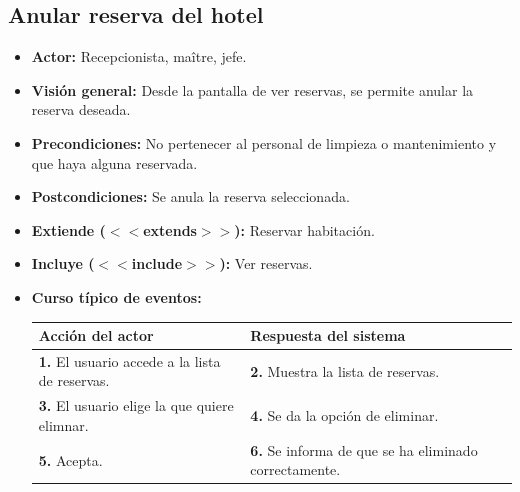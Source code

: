 \documentclass[spanish,a4paper,11pt, twoside]{report}	%
\begin{document}
	\subsection{Anular reserva del hotel}
		\begin{itemize}
			\item \textbf{Actor:} Recepcionista, maître, jefe.
			\item \textbf{Visión general:} Desde la pantalla de ver reservas, se permite anular la reserva deseada. 		
			\item \textbf{Precondiciones:} No pertenecer al personal de limpieza o mantenimiento y que haya alguna reservada.
			\item \textbf{Postcondiciones:} Se anula la reserva seleccionada.
			\item \textbf{Extiende ($<<$extends$>>$):} Reservar habitación.
			\item \textbf{Incluye ($<<$include$>>$):} Ver reservas.
			\item \textbf{Curso típico de eventos:}\\ 
				\begin{tabular}{|p{6cm}||p{6cm}|}
					\hline
					\textbf{Acción del actor} & \textbf{Respuesta del sistema} \\ \hline \hline
					\textbf{1.} El usuario accede a la lista de reservas. & \textbf{2.} Muestra la lista de reservas.\\ \hline 
					\textbf{3.} El usuario elige la que quiere elimnar. & \textbf{4.} Se da la opción de eliminar.\\ \hline 
					\textbf{5.} Acepta. & \textbf{6.} Se informa de que se ha eliminado correctamente.\\ \hline 
				\end{tabular}
		\end {itemize}

\end{document}
